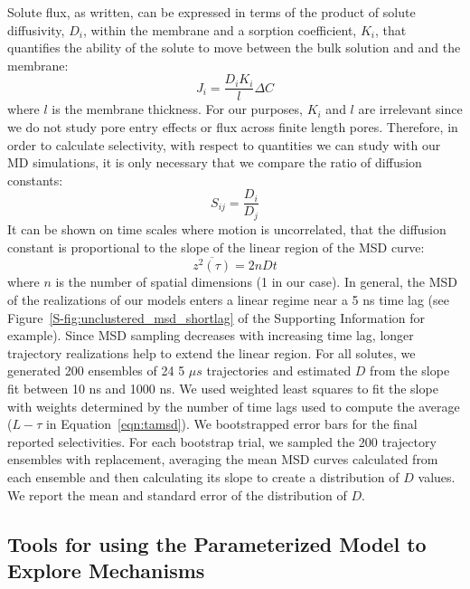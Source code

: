 \documentclass[journal=jpcbfk,manuscript=article]{achemso}
\begin{document}
  Solute flux, as written, can be expressed in terms of the product of solute 
  diffusivity, $D_i$, within the membrane and a sorption coefficient, $K_i$, 
  that quantifies the ability of the solute to move between the bulk solution
  and and the membrane:
  \begin{equation}
    J_i = \frac{D_i K_i}{l}\Delta C
  \end{equation}
  where $l$ is the membrane thickness. For our purposes, $K_i$ and $l$ are 
  irrelevant since we do not study pore entry effects or flux across finite
  length pores. Therefore, in order to calculate selectivity, with respect
  to quantities we can study with our MD simulations, it is only necessary that
  we compare the ratio of diffusion constants:
  \begin{equation}
    S_{ij} = \frac{D_i}{D_j}
    \label{eqn:selectivity_diffusivity}
  \end{equation}
  It can be shown on time scales where motion is uncorrelated, that the diffusion
  constant is proportional to the slope of the linear region of the MSD 
  curve:~\cite{einstein_investigations_1956}
  \begin{equation}
    \overline{z^2(\tau)} = 2 n D t
    \label{eqn:msd_D}
  \end{equation}
  where $n$ is the number of spatial dimensions (1 in our case). In general, the 
  MSD of the realizations of our models enters a linear regime near a 5 ns time lag
  (see Figure~\ref{S-fig:unclustered_msd_shortlag} of the Supporting Information for example).
  Since MSD sampling decreases with increasing time lag, longer trajectory 
  realizations help to extend the linear region. For all solutes, we generated
  200 ensembles of 24 5 $\mu s$ trajectories and estimated $D$ from the slope 
  fit between 10 ns and 1000 ns. We used weighted least squares to fit the 
  slope with weights determined by the number of time lags used to compute 
  the average ($L - \tau$ in Equation~\ref{eqn:tamsd}). 
  We bootstrapped error bars for the final reported selectivities. For each 
  bootstrap trial, we sampled the 200 trajectory ensembles with replacement, 
  averaging the mean MSD curves calculated from each ensemble and then calculating its 
  slope to create a distribution of $D$ values. We report the mean and standard
  error of the distribution of $D$.  
  
  \subsection{Tools for using the Parameterized Model to Explore Mechanisms}\label{method:interactions}
  
\end{document}
